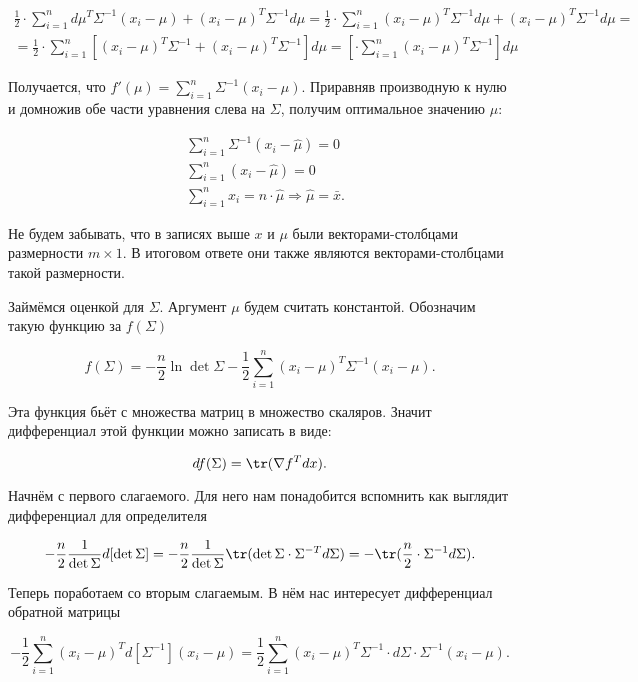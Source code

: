 \begin{sol}
	\begin{multline*}
	 \frac{1}{2} \cdot \sum_{i=1}^n d\mu^T \Sigma^{-1} (x_i - \mu) + (x_i - \mu)^T \Sigma^{-1} d\mu = \frac{1}{2} \cdot \sum_{i=1}^n  (x_i - \mu)^T \Sigma^{-1}  d\mu  + (x_i - \mu)^T \Sigma^{-1} d\mu = \\ = \frac{1}{2} \cdot \sum_{i=1}^n  [(x_i - \mu)^T \Sigma^{-1}  + (x_i - \mu)^T \Sigma^{-1} ] d\mu =  \left[  \cdot \sum_{i=1}^n  (x_i - \mu)^T \Sigma^{-1} \right] d\mu 
	\end{multline*}	
	
	Получается, что $f'(\mu) = \sum_{i=1}^n   \Sigma^{-1} (x_i - \mu)$.  Приравняв производную к нулю и домножив обе части уравнения слева на $\Sigma$, получим оптимальное значению $\mu$: 
	
	\begin{equation*}
	\begin{aligned}
	&\sum_{i=1}^n   \Sigma^{-1} (x_i - \hat \mu) = 0 \\
	&\sum_{i=1}^n   (x_i - \hat \mu) = 0 \\
	&\sum_{i=1}^n   x_i =  n \cdot \hat \mu \Rightarrow \hat \mu = \bar x.
	\end{aligned} 
	\end{equation*}
		
Не будем забывать, что в записях выше $x$ и $\mu$ были векторами-столбцами размерности $m \times 1$. В итоговом ответе они также являются векторами-столбцами такой размерности. 

Займёмся оценкой для $\Sigma.$ Аргумент $\mu$ будем считать константой. Обозначим такую функцию за $f(\Sigma)$

\[
f(\Sigma) = - \frac{n}{2} \ln \det \Sigma - \frac{1}{2} \sum_{i=1}^n (x_i - \mu)^T \Sigma^{-1} (x_i - \mu).
\]

Эта функция бьёт с множества матриц в множество скаляров. Значит дифференциал этой функции можно записать в виде: 

\[
d f(\Sigma) = \tr (\nabla f^T dx).
\]

Начнём с первого слагаемого. Для него нам понадобится вспомнить как выглядит дифференциал для определителя

\[
- \frac{n}{2} \frac{1}{\det \Sigma}  d[\det \Sigma]  = - \frac{n}{2} \frac{1}{\det \Sigma}  \tr( \det \Sigma \cdot \Sigma^{-T} d \Sigma) =   -  \tr( \frac{n}{2} \cdot \Sigma^{-1} d \Sigma).
\]

Теперь поработаем со вторым слагаемым. В нём нас интересует дифференциал обратной матрицы

\[
- \frac{1}{2} \sum_{i=1}^n (x_i - \mu)^T d[\Sigma^{-1}] (x_i - \mu) = \frac{1}{2} \sum_{i=1}^n (x_i - \mu)^T \Sigma^{-1} \cdot  d \Sigma \cdot \Sigma^{-1} (x_i - \mu). 
\]	
	

\end{sol}
